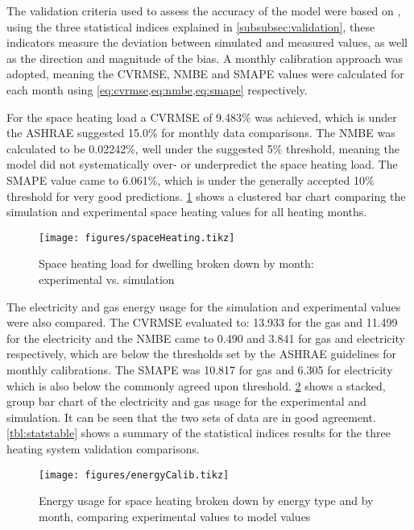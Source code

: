 The validation criteria used to assess the accuracy of the model were based on   \cite{ashrae_guideline_project_committee_14_ashrae_2014}, using the three statistical indices explained in \cref{subsubsec:validation}, these indicators measure the deviation between simulated and measured values, as well as the direction and magnitude of the bias. A monthly calibration approach was adopted, meaning the \ac{CVRMSE}, \ac{NMBE} and \ac{SMAPE} values were calculated for each month using \cref{eq:cvrmse,eq:nmbe,eq:smape} respectively. 

For the space heating load a \ac{CVRMSE} of 9.483\% was achieved, which is under the ASHRAE suggested 15.0\% for monthly data comparisons. The \ac{NMBE} was calculated to be 0.02242\%, well under the suggested 5\%  threshold, meaning the model did not systematically over- or underpredict the space heating load. The \ac{SMAPE} value came to 6.061\%, which is under the generally accepted 10\% threshold for very good predictions. \cref{fig:spaceheatingcalib} shows a clustered bar chart comparing the simulation and experimental space heating values for all heating months. 

\begin{figure}[htb]
    \centering
    \texttt{[image: figures/spaceHeating.tikz]}
    \caption{Space heating load for dwelling broken down by month: experimental vs. simulation}
    \label{fig:spaceheatingcalib}
\end{figure}


The electricity and gas energy usage for the simulation and experimental values were also compared. The \ac{CVRMSE} evaluated to: \num{13.933} for the gas and \num{11.499} for the electricity and the \ac{NMBE} came to \num{0.490} and \num{3.841} for gas and electricity respectively, which are below the thresholds set by the ASHRAE guidelines for monthly calibrations. The \ac{SMAPE} was \num{10.817} for gas and \num{6.305} for electricity which is also below the commonly agreed upon threshold. \cref{fig:energycalib} shows a stacked, group bar chart of the electricity and gas usage for the experimental and simulation. It can be seen that the two sets of data are in good agreement. \cref{tbl:statstable} shows a summary of the statistical indices results for the three heating system validation comparisons.


\begin{figure}[htb]
    \centering
    \texttt{[image: figures/energyCalib.tikz]}
    \caption{Energy usage for space heating broken down by energy type and by month, comparing experimental values to model values}
    \label{fig:energycalib}
\end{figure}

